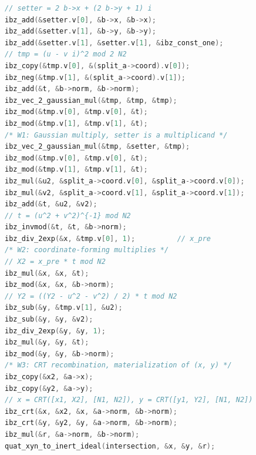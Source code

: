 \begin{lstlisting}[language=C, float=tb, basicstyle=\ttfamily\scriptsize, label={lst:exp-intersection},
  caption={Traced tail of \texttt{quat\_ideal\_intersect\_O0} (\texttt{src/ideal.c}
  of the reference implementation; initializations and assertions omitted).
  \texttt{a} is the operand with split generator \texttt{split\_a}${}=u+vi$ and
  \texttt{b} the operand in inert representation
  (\texttt{b->x}, \texttt{b->y}, \texttt{b->norm}${}=N_2$) whose coordinates
  are secret-dependent. The comments W1--W3 mark the regions analysed in the
  text: the Gaussian multiply, the coordinate-forming multiplies, and the CRT
  recombination with materialization of $(x,y)$.}]
// setter = 2 b->x + (2 b->y + 1) i
ibz_add(&setter.v[0], &b->x, &b->x);
ibz_add(&setter.v[1], &b->y, &b->y);
ibz_add(&setter.v[1], &setter.v[1], &ibz_const_one);
// tmp = (u - v i)^2 mod 2 N2
ibz_copy(&tmp.v[0], &(split_a->coord).v[0]);
ibz_neg(&tmp.v[1], &(split_a->coord).v[1]);
ibz_add(&t, &b->norm, &b->norm);
ibz_vec_2_gaussian_mul(&tmp, &tmp, &tmp);
ibz_mod(&tmp.v[0], &tmp.v[0], &t);
ibz_mod(&tmp.v[1], &tmp.v[1], &t);
/* W1: Gaussian multiply, setter is a multiplicand */
ibz_vec_2_gaussian_mul(&tmp, &setter, &tmp);
ibz_mod(&tmp.v[0], &tmp.v[0], &t);
ibz_mod(&tmp.v[1], &tmp.v[1], &t);
ibz_mul(&u2, &split_a->coord.v[0], &split_a->coord.v[0]);
ibz_mul(&v2, &split_a->coord.v[1], &split_a->coord.v[1]);
ibz_add(&t, &u2, &v2);
// t = (u^2 + v^2)^{-1} mod N2
ibz_invmod(&t, &t, &b->norm);
ibz_div_2exp(&x, &tmp.v[0], 1);          // x_pre
/* W2: coordinate-forming multiplies */
// X2 = x_pre * t mod N2
ibz_mul(&x, &x, &t);
ibz_mod(&x, &x, &b->norm);
// Y2 = ((Y2 - u^2 - v^2) / 2) * t mod N2
ibz_sub(&y, &tmp.v[1], &u2);
ibz_sub(&y, &y, &v2);
ibz_div_2exp(&y, &y, 1);
ibz_mul(&y, &y, &t);
ibz_mod(&y, &y, &b->norm);
/* W3: CRT recombination, materialization of (x, y) */
ibz_copy(&x2, &a->x);
ibz_copy(&y2, &a->y);
// x = CRT([x1, X2], [N1, N2]), y = CRT([y1, Y2], [N1, N2])
ibz_crt(&x, &x2, &x, &a->norm, &b->norm);
ibz_crt(&y, &y2, &y, &a->norm, &b->norm);
ibz_mul(&r, &a->norm, &b->norm);
quat_xyn_to_inert_ideal(intersection, &x, &y, &r);
\end{lstlisting}
